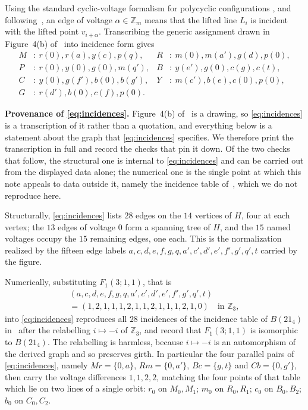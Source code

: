 \documentclass[11pt]{amsart}
\theoremstyle{remark}
\newcommand{\Z}{\mathbb Z}
\begin{document}
Using the standard cyclic-voltage formalism for polycyclic
configurations \cite{BP}, and following~\cite[Sec.~2]{BGP}, an edge of
voltage $\alpha\in\Z_m$ means that the lifted line $L_i$ is incident with
the lifted point $v_{i+\alpha}$. Transcribing the generic assignment drawn in
Figure~4(b) of~\cite{BGP} into incidence form gives
\begin{equation}\label{eq:incidences}
\begin{aligned}
M&:\ r(0),r(a),y(c),p(q),
& R&:\ m(0),m(a'),g(d),p(0),\\
P&:\ r(0),y(0),g(0),m(q'),
& B&:\ y(e'),g(0),c(g),c(t),\\
C&:\ y(0),g(f'),b(0),b(g'),
& Y&:\ m(c'),b(e),c(0),p(0),\\
G&:\ r(d'),b(0),c(f),p(0).
\end{aligned}
\end{equation}

\medskip
\noindent\textbf{Provenance of \eqref{eq:incidences}.}
Figure~4(b) of~\cite{BGP} is a drawing, so \eqref{eq:incidences} is a
transcription of it rather than a quotation, and everything below is a
statement about the graph that \eqref{eq:incidences} specifies. We therefore
print the transcription in full and record the checks that pin it down. Of
the two checks that follow, the structural one is internal to
\eqref{eq:incidences} and can be carried out from the displayed data alone;
the numerical one is the single point at which this note appeals to data
outside it, namely the incidence table of~\cite[Table~1]{BGP}, which we do
not reproduce here.

Structurally, \eqref{eq:incidences} lists $28$ edges on the $14$ vertices of
$H$, four at each vertex; the $13$ edges of voltage $0$ form a spanning tree
of $H$, and the $15$ named voltages occupy the $15$ remaining edges, one
each. This is the normalization realized by the fifteen edge labels
$a,c,d,e,f,g,q,a',c',d',e',f',g',q',t$ carried by the figure.

Numerically, substituting $F_1(3;1,1)$, that is
\begin{multline*}
(a,c,d,e,f,g,q,a',c',d',e',f',g',q',t)\\
=(1,2,1,1,1,2,1,1,2,1,1,1,2,1,0)\quad\text{in }\Z_3,
\end{multline*}
into \eqref{eq:incidences} reproduces all $28$ incidences of the incidence
table of $B(21_4)$ in~\cite[Table~1]{BGP} after the relabelling
$i\mapsto-i$ of $\Z_3$, and \cite{BGP} record that $F_1(3;1,1)$ is isomorphic
to $B(21_4)$. The relabelling is harmless, because $i\mapsto-i$
is an automorphism of the derived graph and so preserves girth. In particular
the four parallel pairs of
\eqref{eq:incidences}, namely $Mr=\{0,a\}$, $Rm=\{0,a'\}$, $Bc=\{g,t\}$ and
$Cb=\{0,g'\}$, then carry the voltage differences $1,1,2,2$, matching the
four points of that table which lie on two lines of a single orbit: $r_0$ on
$M_0,M_1$; $m_0$ on $R_0,R_1$; $c_0$ on $B_0,B_2$; $b_0$ on $C_0,C_2$.
\end{document}
